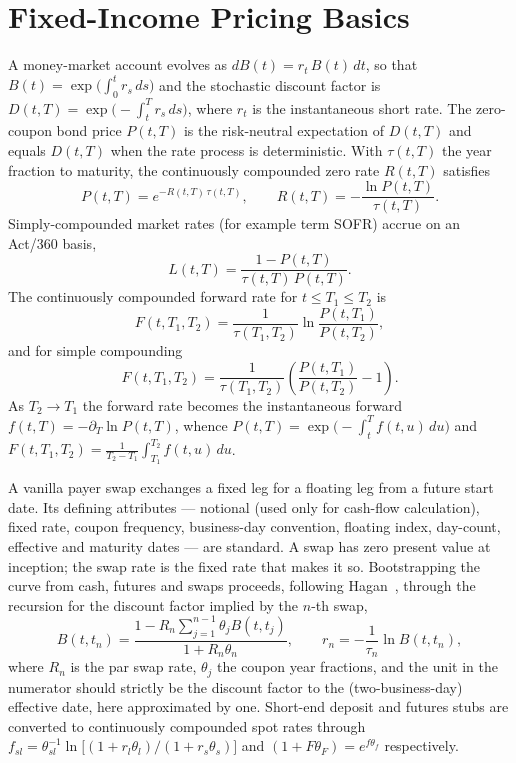 \documentclass[]{interact}
\theoremstyle{plain}
\begin{document}
\section{Fixed-Income Pricing Basics}\label{sec:fi}
A money-market account evolves as $dB(t)=r_t\,B(t)\,dt$, so that
$B(t)=\exp\!\big(\int_0^t r_s\,ds\big)$ and the stochastic discount factor is
$D(t,T)=\exp\!\big(-\int_t^T r_s\,ds\big)$, where $r_t$ is the instantaneous short rate. The
zero-coupon bond price $P(t,T)$ is the risk-neutral expectation of $D(t,T)$ and equals
$D(t,T)$ when the rate process is deterministic. With $\tau(t,T)$ the year fraction to
maturity, the continuously compounded zero rate $R(t,T)$ satisfies
\begin{equation}
P(t,T)=e^{-R(t,T)\,\tau(t,T)},\qquad
R(t,T)=-\frac{\ln P(t,T)}{\tau(t,T)}.
\end{equation}
Simply-compounded market rates (for example term SOFR) accrue on an Act/360 basis,
\begin{equation}
L(t,T)=\frac{1-P(t,T)}{\tau(t,T)\,P(t,T)} .
\end{equation}
The continuously compounded forward rate for $t\le T_1\le T_2$ is
\begin{equation}
F(t,T_1,T_2)=\frac{1}{\tau(T_1,T_2)}\ln\frac{P(t,T_1)}{P(t,T_2)},
\end{equation}
and for simple compounding
\begin{equation}
F(t,T_1,T_2)=\frac{1}{\tau(T_1,T_2)}\!\left(\frac{P(t,T_1)}{P(t,T_2)}-1\right). \label{eq:fwdsimple}
\end{equation}
As $T_2\to T_1$ the forward rate becomes the instantaneous forward
$f(t,T)=-\partial_T\ln P(t,T)$, whence $P(t,T)=\exp\!\big(-\int_t^T f(t,u)\,du\big)$ and
$F(t,T_1,T_2)=\tfrac{1}{T_2-T_1}\int_{T_1}^{T_2} f(t,u)\,du$.

A vanilla payer swap exchanges a fixed leg for a floating leg from a future start date. Its
defining attributes --- notional (used only for cash-flow calculation), fixed rate, coupon
frequency, business-day convention, floating index, day-count, effective and maturity dates ---
are standard. A swap has zero present value at inception; the swap rate is the fixed rate that
makes it so. Bootstrapping the curve from cash, futures and swaps proceeds, following
Hagan~\cite{Hagan}, through the recursion for the discount factor implied by the $n$-th swap,
\begin{equation}
B(t,t_n)=\frac{1-R_n\sum_{j=1}^{n-1}\theta_j B(t,t_j)}{1+R_n\theta_n},\qquad
r_n=-\frac{1}{\tau_n}\ln B(t,t_n),
\label{eq:bootstrap}
\end{equation}
where $R_n$ is the par swap rate, $\theta_j$ the coupon year fractions, and the unit in the
numerator should strictly be the discount factor to the (two-business-day) effective date,
here approximated by one. Short-end deposit and futures stubs are converted to continuously
compounded spot rates through $f_{sl}=\theta_{sl}^{-1}\ln\big[(1+r_l\theta_l)/(1+r_s\theta_s)\big]$
and $(1+F\theta_F)=e^{f\theta_f}$ respectively.
\end{document}
